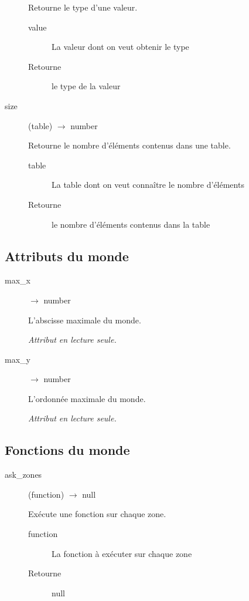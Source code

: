 \begin{description}
	Retourne le type d'une valeur.

	\begin{description}
		\item[value] La valeur dont on veut obtenir le type
		\item[Retourne] le type de la valeur
	\end{description}

	\item[size] (table) $\rightarrow$ number

	Retourne le nombre d'éléments contenus dans une table.

	\begin{description}
		\item[table] La table dont on veut connaître le nombre d'éléments
		\item[Retourne] le nombre d'éléments contenus dans la table
	\end{description}
\end{description}

\subsection{Attributs du monde}

\begin{description}
	\item[max\_x] $\rightarrow$ number

	L'abscisse maximale du monde.

	\emph{Attribut en lecture seule.}

	\item[max\_y] $\rightarrow$ number

	L'ordonnée maximale du monde.

	\emph{Attribut en lecture seule.}
\end{description}

\subsection{Fonctions du monde}

\begin{description}
	\item[ask\_zones] (function) $\rightarrow$ null

	Exécute une fonction sur chaque zone.

	\begin{description}
		\item[function] La fonction à exécuter sur chaque zone
		\item[Retourne] null
	\end{description}

\end{description}

